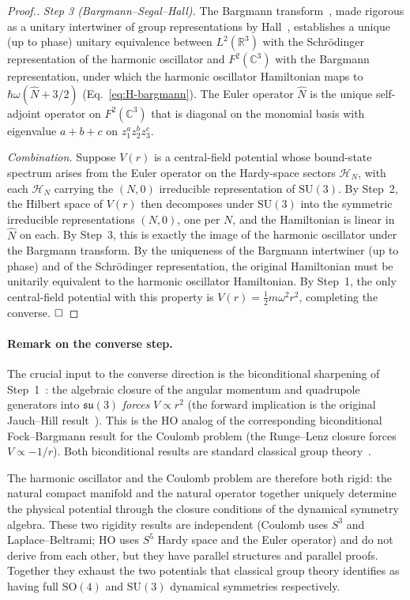 \documentclass[twocolumn,pra,amsmath,amssymb,superscriptaddress]{revtex4-2}
\begin{document}
\begin{proof}[Proof.]
\emph{Step 3 (Bargmann--Segal--Hall).}  The Bargmann
transform~\cite{bargmann1961}, made rigorous as a unitary
intertwiner of group representations by
Hall~\cite{hall1994}, establishes a unique (up to phase)
unitary equivalence between $L^2(\mathbb{R}^3)$ with the
Schr\"odinger representation of the harmonic oscillator and
$F^2(\mathbb{C}^3)$ with the Bargmann representation, under
which the harmonic oscillator Hamiltonian maps to
$\hbar\omega(\hat{N} + 3/2)$ (Eq.~\eqref{eq:H-bargmann}).
The Euler operator $\hat{N}$ is the unique self-adjoint operator
on $F^2(\mathbb{C}^3)$ that is diagonal on the monomial basis
with eigenvalue $a + b + c$ on $z_1^a z_2^b z_3^c$.

\emph{Combination.}  Suppose $V(r)$ is a central-field potential
whose bound-state spectrum arises from the Euler operator on the
Hardy-space sectors $\mathcal{H}_N$, with each $\mathcal{H}_N$
carrying the $(N, 0)$ irreducible representation of
$\mathrm{SU}(3)$.  By Step~2, the Hilbert space of $V(r)$ then
decomposes under $\mathrm{SU}(3)$ into the symmetric irreducible
representations $(N, 0)$, one per $N$, and the Hamiltonian is
linear in $\hat{N}$ on each.  By Step~3, this is exactly the
image of the harmonic oscillator under the Bargmann transform.
By the uniqueness of the Bargmann intertwiner (up to phase) and
of the Schr\"odinger representation, the original Hamiltonian
must be unitarily equivalent to the harmonic oscillator
Hamiltonian.  By Step~1, the only central-field potential with
this property is $V(r) = \frac{1}{2} m \omega^2 r^2$, completing
the converse.  $\hfill\square$
\end{proof}

\paragraph{Remark on the converse step.}
The crucial input to the converse direction is the biconditional
sharpening of Step~1~\cite{wybourne1974, iachello2006}: the
algebraic closure of the angular momentum and quadrupole
generators into $\mathfrak{su}(3)$ \emph{forces} $V \propto r^2$
(the forward implication is the original Jauch--Hill
result~\cite{jauchhill1940}).  This is the HO analog of the
corresponding biconditional Fock--Bargmann result for the Coulomb
problem (the Runge--Lenz closure forces $V \propto -1/r$).  Both
biconditional results are standard classical group
theory~\cite{wybourne1974, iachello2006}.

The harmonic oscillator and the Coulomb problem are therefore
both rigid: the natural compact manifold and the natural
operator together uniquely determine the physical potential
through the closure conditions of the dynamical symmetry
algebra.  These two rigidity results are independent (Coulomb
uses $S^3$ and Laplace--Beltrami; HO uses $S^5$ Hardy space
and the Euler operator) and do not derive from each other, but
they have parallel structures and parallel proofs.  Together
they exhaust the two potentials that classical group theory
identifies as having full $\mathrm{SO}(4)$ and $\mathrm{SU}(3)$
dynamical symmetries respectively.
\end{document}
